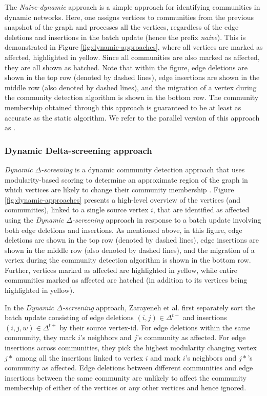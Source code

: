 The \textit{Naive-dynamic} approach is a simple approach for identifying communities in dynamic networks. Here, one assigns vertices to communities from the previous snapshot of the graph and processes all the vertices, regardless of the edge deletions and insertions in the batch update (hence the prefix \textit{naive}). This is demonstrated in Figure \ref{fig:dynamic-approaches}, where all vertices are marked as affected, highlighted in yellow. Since all communities are also marked as affected, they are all shown as hatched. Note that within the figure, edge deletions are shown in the top row (denoted by dashed lines), edge insertions are shown in the middle row (also denoted by dashed lines), and the migration of a vertex during the community detection algorithm is shown in the bottom row. The community membership obtained through this approach is guaranteed to be at least as accurate as the static algorithm. We refer to the parallel version of this approach as \Nai{}.


\subsubsection{Dynamic Delta-screening approach \cite{com-zarayeneh21}}
\label{sec:delta-screening}

\textit{Dynamic $\Delta$-screening} is a dynamic community detection approach that uses modularity-based scoring to determine an approximate region of the graph in which vertices are likely to change their community membership \cite{com-zarayeneh21}. Figure \ref{fig:dynamic-approaches} presents a high-level overview of the vertices (and communities), linked to a single source vertex $i$, that are identified as affected using the \textit{Dynamic $\Delta$-screening} approach in response to a batch update involving both edge deletions and insertions. As mentioned above, in this figure, edge deletions are shown in the top row (denoted by dashed lines), edge insertions are shown in the middle row (also denoted by dashed lines), and the migration of a vertex during the community detection algorithm is shown in the bottom row. Further, vertices marked as affected are highlighted in yellow, while entire communities marked as affected are hatched (in addition to its vertices being highlighted in yellow).

In the \textit{Dynamic $\Delta$-screening} approach, Zarayeneh et al. first separately sort the batch update consisting of edge deletions $(i, j) \in \Delta^{t-}$ and insertions $(i, j, w) \in \Delta^{t+}$ by their source vertex-id. For edge deletions within the same community, they mark $i$'s neighbors and $j$'s community as affected. For edge insertions across communities, they pick the highest modularity changing vertex $j*$ among all the insertions linked to vertex $i$ and mark $i$'s neighbors and $j*$'s community as affected. Edge deletions between different communities and edge insertions between the same community are unlikely to affect the community membership of either of the vertices or any other vertices and hence ignored.


